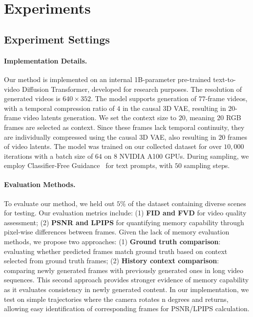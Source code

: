 \section{Experiments}


\subsection{Experiment Settings}
\paragraph{Implementation Details.}
Our method is implemented on an internal 1B-parameter pre-trained text-to-video Diffusion Transformer, developed for research purposes. The resolution of generated videos is $640\times 352$. The model supports generation of $77$-frame videos, with a temporal compression ratio of $4$ in the causal 3D VAE, resulting in $20$-frame video latents generation. We set the context size to $20$, meaning $20$ RGB frames are selected as context. Since these frames lack temporal continuity, they are individually compressed using the causal 3D VAE, also resulting in $20$ frames of video latents. The model was trained on our collected dataset for over $10,000$ iterations with a batch size of $64$ on $8$ NVIDIA A100 GPUs. During sampling, we employ Classifier-Free Guidance~\cite{cfg} for text prompts, with $50$ sampling steps.

\paragraph{Evaluation Methods.}
To evaluate our method, we held out $5\%$ of the dataset containing diverse scenes for testing. Our evaluation metrics include: 
(1) \textbf{FID and FVD} for video quality assessment; 
(2) \textbf{PSNR and LPIPS} for quantifying memory capability through pixel-wise differences between frames. 
Given the lack of memory evaluation methods, we propose two approaches: (1) \textbf{Ground truth comparison}: evaluating whether predicted frames match ground truth based on context selected from ground truth frames; (2) \textbf{History context comparison}: comparing newly generated frames with previously generated ones in long video sequences. This second approach provides stronger evidence of memory capability as it evaluates consistency in newly generated content. In our implementation, we test on simple trajectories where the camera rotates n degrees and returns, allowing easy identification of corresponding frames for PSNR/LPIPS calculation.


